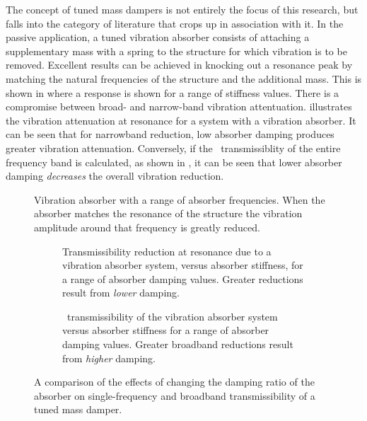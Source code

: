 The concept of tuned mass dampers is not entirely the focus of this research,
but falls into the category of literature that crops up in association with
it. In the passive application, a tuned vibration absorber consists of
attaching a supplementary mass with a spring to the structure for which
vibration is to be removed. Excellent results can be achieved in knocking out
a resonance peak by matching the natural frequencies of the structure and the
additional mass. This is shown in  where a response
is shown for a range of stiffness values. There is a compromise between broad-
and narrow-band vibration attentuation. 
illustrates the vibration attenuation at resonance for a system with a
vibration absorber. It can be seen that for narrowband reduction, low absorber
damping produces greater vibration attenuation. Conversely, if the \RMS\
transmissiblity of the entire frequency band is calculated, as shown in
\figref{rms-inertial}, it can be seen that lower absorber damping
\emph{decreases} the overall vibration reduction.

\begin{figure}
   \caption{Vibration absorber with a range of absorber frequencies. 
   When the absorber matches the resonance of the structure the vibration 
   amplitude around that frequency is greatly reduced.}
\end{figure}

\begin{figure}
\begin{wide}
  \begin{subfigure}
    \caption{Transmissibility reduction at resonance due to a vibration 
    absorber system, versus absorber stiffness, for a range of absorber 
    damping values. Greater reductions result from \emph{lower} damping.}
    \figlabel{inertial-trans-delta}
  \end{subfigure}
  \begin{subfigure}
    \caption{\RMS\ transmissibility of the vibration absorber system versus 
    absorber stiffness for a range of absorber damping values. Greater 
    broadband reductions result from \emph{higher} damping.}
  \end{subfigure}
\end{wide}
\caption{A comparison of the effects of changing the damping ratio of the 
absorber on single-frequency and broadband transmissibility of a tuned mass 
damper.}
\end{figure}

